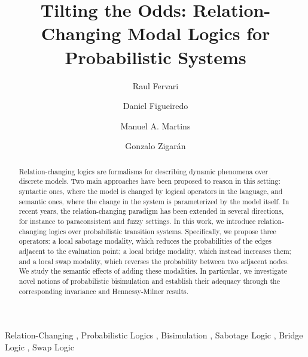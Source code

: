 \documentclass[preprint]{elsarticle}
\theoremstyle{definition}
\theoremstyle{remark}
\begin{document}
\begin{frontmatter}

\title{Tilting the Odds: Relation-Changing Modal Logics for Probabilistic Systems}
\author[unc,conicet]{Raul Fervari}
\author[aveiro,coimbra]{Daniel Figueiredo}
\author[aveiro]{Manuel A. Martins}
\author[unc]{Gonzalo Zigar\'an}

\address[unc]{
    FAMAF, Universidad Nacional de C\'ordoba, Argentina
}

\address[conicet]{
    Consejo Nacional de Investigaciones Cient\'ificas y T\'ecnicas, Argentina
}

\address[aveiro]{
    Center for Research and Development in Mathematics and Applications (CIDMA), Universidade de Aveiro, Portugal
}

\address[coimbra]{
    Association for Innovation and Biomedical Research on Light and Image, Portugal
 }

\begin{abstract} 
Relation-changing logics are formalisms for describing dynamic phenomena over discrete models. Two main approaches have been proposed to reason in this setting: syntactic ones, where the model is changed by logical operators in the language, and semantic ones, where the change in the system is parameterized by the model itself. In recent years, the relation-changing paradigm has been extended in several directions, for instance to paraconsistent and fuzzy settings. In this work, we introduce relation-changing logics over probabilistic transition systems. Specifically, we propose three operators: a local sabotage modality, which reduces the probabilities of the edges adjacent to the evaluation point; a local bridge modality, which instead increases them; and a local swap modality, which reverses the probability between two adjacent nodes. We study the semantic effects of adding these modalities. In particular, we investigate novel notions of probabilistic bisimulation and establish their adequacy through the corresponding invariance and Hennessy-Milner results.
\end{abstract}

\begin{keyword}
Relation-Changing \sep
Probabilistic Logics \sep
Bisimulation \sep
Sabotage Logic \sep
Bridge Logic \sep 
Swap Logic
\end{keyword}

\end{frontmatter}
\end{document}
